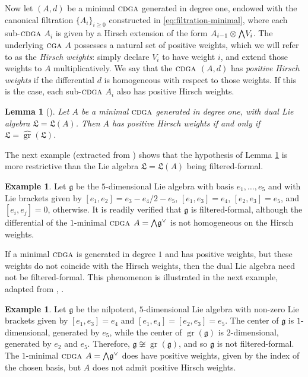 \documentclass{article}
\numberwithin{equation}{section}
\newtheorem{lemma}[theorem]{Lemma}
\theoremstyle{definition}
\newtheorem{example}[theorem]{Example}
\newcommand{\g}{{\mathfrak{g}}}
\newcommand{\fL}{\mathfrak{L}}
\newcommand{\cga}{\ensuremath{\textsc{cga}}}
\newcommand{\cdga}{\ensuremath{\textsc{cdga}}}
\DeclareMathOperator{\gr}{gr}
\newcommand{\bwedge}{\mbox{\normalsize $\bigwedge$}}
\begin{document}
Now let $(A,d)$ be a minimal $\cdga$ generated in degree one, 
endowed with the canonical filtration $\{A_i\}_{i\ge 0}$ constructed in 
\eqref{eq:filtration-minimal}, where each sub-$\cdga$ $A_i$ is given by 
a Hirsch extension of the form $A_{i-1}\otimes \bwedge V_i$. 
The underlying $\cga$ $A$ possesses a natural set of positive 
weights, which we will refer to as the {\em Hirsch weights}: simply declare 
$V_i$ to have weight $i$, and extend those weights to $A$ multiplicatively.  
We say that the $\cdga$ $(A,d)$ has {\em positive Hirsch weights}\/ if 
the differential $d$ is homogeneous with respect to those weights.  
If this is the case, each sub-$\cdga$ $A_i$ also has positive Hirsch weights. 

\begin{lemma}[\cite{SW-forum}]
\label{lem:positivegraded}
Let $A$ be a minimal $\cdga$ generated in degree one, 
with dual Lie algebra $\fL=\fL(A)$. Then $A$ has positive Hirsch 
weights if and only if $\fL=\widehat{\gr}(\fL)$.
\end{lemma}

The next example (extracted from \cite{SW-forum}) shows that the 
hypothesis of Lemma \ref{lem:positivegraded} is more restrictive 
than the Lie algebra $\fL=\fL(A)$ being filtered-formal.

\begin{example}
\label{ex:3step}
Let $\g$ be the $5$-dimensional Lie algebra with basis $e_1,\dots, e_5$ 
and with Lie brackets given by 
$[e_1,e_2]=e_3-e_4/2-e_5$, $[e_1,e_3]=e_4$, $[e_2,e_3]=e_5$, and 
$[e_i,e_j]=0$, otherwise. It is readily verified that $\g$ is filtered-formal, 
although the differential of the $1$-minimal $\cdga$ $A=\bwedge \g^{\vee}$
is not homogeneous on the Hirsch weights. 
\end{example}

If a minimal $\cdga$ is generated in degree $1$ and has positive 
weights, but these weights do not coincide with the Hirsch weights, 
then the dual Lie algebra need not be filtered-formal.  
This phenomenon is illustrated in the next example, 
adapted from \cite{Cornulier14}, \cite{SW-forum}.

\begin{example}
\label{ex:Cornulier}
Let $\g$ be the nilpotent, $5$-dimensional Lie algebra with non-zero 
Lie brackets given by $[e_1,e_3]=e_4$ and $[e_1,e_4]=[e_2,e_3]=e_5$. 
The center of $\g$ is $1$-dimensional, generated by $e_5$, while the 
center of $\gr(\g)$ is $2$-dimensional, generated by $e_2$ and $e_5$.
Therefore, $\g\not\cong \gr(\g)$, and so $\g$ is not filtered-formal. 
The $1$-minimal $\cdga$ $A=\bwedge \g^{\vee}$ does have positive 
weights, given by the index of the chosen basis, but $A$ 
does not admit positive Hirsch weights.  
\end{example}
\end{document}
